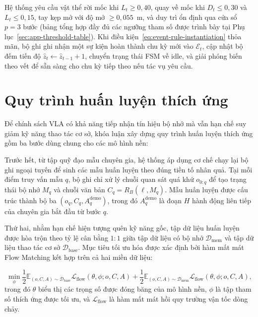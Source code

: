 Hệ thống yêu cầu vật thể rời mốc khi $L_t \ge 0{,}40$, quay về mốc khi $D_t \le 0{,}30$ và $L_t \le 0{,}15$, tay kẹp mở với độ mở $\ge 0{,}055$~m, và duy trì ổn định qua cửa sổ $p = 3$ bước (bảng tổng hợp đầy đủ các ngưỡng tham số được trình bày tại Phụ lục~\ref{sec:app-threshold-table}). Khi điều kiện~\eqref{eq:event-rule-instantiation} thỏa mãn, bộ ghi ghi nhận một sự kiện hoàn thành chu kỳ mới vào $\mathcal E_t$, cập nhật bộ đếm tiến độ $\hat z_t \leftarrow \hat z_{t-1} + 1$, chuyển trạng thái FSM về $\text{idle}$, và giải phóng biến theo vết để sẵn sàng cho chu kỳ tiếp theo nếu tác vụ yêu cầu.

\section{Quy trình huấn luyện thích ứng}
\label{sec:adaptation}

Để chính sách VLA có khả năng tiếp nhận tín hiệu bộ nhớ mà vẫn hạn chế suy giảm kỹ năng thao tác cơ sở, khóa luận xây dựng quy trình huấn luyện thích ứng gồm ba bước dùng chung cho các mô hình nền:

Trước hết, từ tập quỹ đạo mẫu chuyên gia, hệ thống áp dụng cơ chế chạy lại bộ ghi ngoại tuyến để sinh các mẫu huấn luyện theo đúng tiền tố nhân quả. Tại mỗi điểm truy vấn mẫu $q$, bộ ghi chỉ xử lý chuỗi quan sát quá khứ $o_{0:q}$ để tạo trạng thái bộ nhớ $M_q$ và chuỗi văn bản $C_q = R_B(\ell, M_q)$. Mẫu huấn luyện được cấu trúc thành bộ ba $(o_q, C_q, A_q^{\mathrm{demo}})$, trong đó $A_q^{\mathrm{demo}}$ là đoạn $H$ hành động liên tiếp của chuyên gia bắt đầu từ bước $q$.

Thứ hai, nhằm hạn chế hiện tượng quên kỹ năng gốc, tập dữ liệu huấn luyện được hòa trộn theo tỷ lệ cân bằng $1:1$ giữa tập dữ liệu có bộ nhớ $\mathcal D_{\mathrm{mem}}$ và tập dữ liệu thao tác cơ sở $\mathcal D_{\mathrm{base}}$. Mục tiêu tối ưu hóa được xác định bởi hàm mất mát Flow Matching kết hợp trên cả hai miền dữ liệu:

\begin{equation}
\min_\phi \frac{1}{2} \mathbb E_{(o, C, A) \sim \mathcal D_{\mathrm{base}}} \mathcal L_{\mathrm{flow}}(\theta, \phi; o, C, A) + \frac{1}{2} \mathbb E_{(o, C, A) \sim \mathcal D_{\mathrm{mem}}} \mathcal L_{\mathrm{flow}}(\theta, \phi; o, C, A),
\label{eq:training-loss}
\end{equation}
trong đó $\theta$ biểu thị các trọng số được đóng băng của mô hình nền, $\phi$ là tập tham số thích ứng được tối ưu, và $\mathcal L_{\mathrm{flow}}$ là hàm mất mát hồi quy trường vận tốc dòng chảy.

